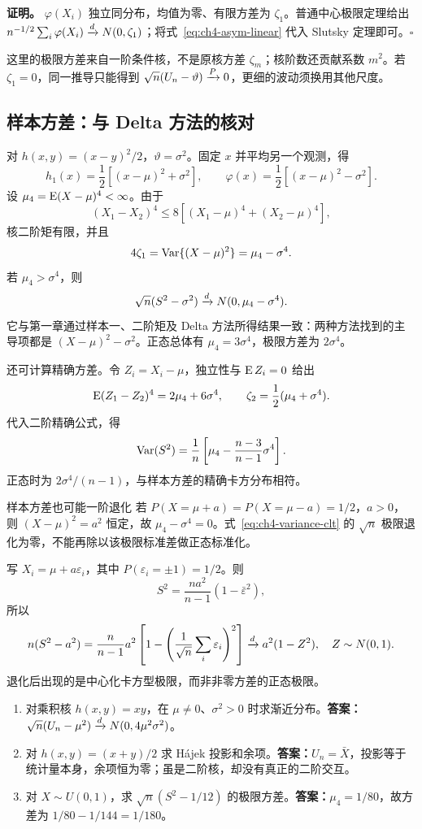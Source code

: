 \textbf{证明。} $\varphi(X_i)$ 独立同分布，均值为零、有限方差为 $\zeta_1$。普通中心极限定理给出 $n^{-1/2}\sum_i\varphi(X_i)\xrightarrow{d} N(0,\zeta_1)$；将式~\eqref{eq:ch4-asym-linear} 代入 Slutsky 定理即可。\hfill$\square$

这里的极限方差来自一阶条件核，不是原核方差 $\zeta_m$；核阶数还贡献系数 $m^2$。若 $\zeta_1=0$，同一推导只能得到 $\sqrt n(U_n-\vartheta)\xrightarrow{P}0$，更细的波动须换用其他尺度。

\subsection{样本方差：与 Delta 方法的核对}

对 $h(x,y)=(x-y)^2/2$，$\vartheta=\sigma^2$。固定 $x$ 并平均另一个观测，得
\[
 h_1(x)=\frac12[(x-\mu)^2+\sigma^2],\qquad
 \varphi(x)=\frac12[(x-\mu)^2-\sigma^2].
\]
设 $\mu_4=\operatorname{E}(X-\mu)^4<\infty$。由于
\[
 (X_1-X_2)^4\leq8[(X_1-\mu)^4+(X_2-\mu)^4],
\]
核二阶矩有限，并且
\[
 4\zeta_1=\operatorname{Var}\{(X-\mu)^2\}=\mu_4-\sigma^4.
\]
若 $\mu_4>\sigma^4$，则
\begin{equation}
 \sqrt n(S^2-\sigma^2)\xrightarrow{d} N(0,\mu_4-\sigma^4).
 \label{eq:ch4-variance-clt}
\end{equation}
它与第一章通过样本一、二阶矩及 Delta 方法所得结果一致：两种方法找到的主导项都是 $(X-\mu)^2-\sigma^2$。正态总体有 $\mu_4=3\sigma^4$，极限方差为 $2\sigma^4$。

还可计算精确方差。令 $Z_i=X_i-\mu$，独立性与 $\operatorname{E} Z_i=0$ 给出
\[
 \operatorname{E}(Z_1-Z_2)^4=2\mu_4+6\sigma^4,
 \qquad\zeta_2=\frac12(\mu_4+\sigma^4).
\]
代入二阶精确公式，得
\[
 \operatorname{Var}(S^2)=\frac1n
 \left[\mu_4-\frac{n-3}{n-1}\sigma^4\right].
\]
正态时为 $2\sigma^4/(n-1)$，与样本方差的精确卡方分布相符。

\begin{examplebox}{样本方差也可能一阶退化}
若 $P(X=\mu+a)=P(X=\mu-a)=1/2$，$a>0$，则 $(X-\mu)^2=a^2$ 恒定，故 $\mu_4-\sigma^4=0$。式~\eqref{eq:ch4-variance-clt} 的 $\sqrt n$ 极限退化为零，不能再除以该极限标准差做正态标准化。

写 $X_i=\mu+a\varepsilon_i$，其中 $P(\varepsilon_i=\pm1)=1/2$。则
\[
 S^2=\frac{na^2}{n-1}(1-\bar\varepsilon^2),
\]
所以
\[
 n(S^2-a^2)=\frac n{n-1}a^2
 \left[1-\left(\frac1{\sqrt n}\sum_i\varepsilon_i\right)^2\right]
 \xrightarrow{d} a^2(1-Z^2),\quad Z\sim N(0,1).
\]
退化后出现的是中心化卡方型极限，而非非零方差的正态极限。
\end{examplebox}

\begin{notebox}[练习与答案线索]
\begin{enumerate}
 \item 对乘积核 $h(x,y)=xy$，在 $\mu\neq0$、$\sigma^2>0$ 时求渐近分布。\textbf{答案：}$\sqrt n(U_n-\mu^2)\xrightarrow{d} N(0,4\mu^2\sigma^2)$。
 \item 对 $h(x,y)=(x+y)/2$ 求 H\'ajek 投影和余项。\textbf{答案：}$U_n=\bar X$，投影等于统计量本身，余项恒为零；虽是二阶核，却没有真正的二阶交互。
 \item 对 $X\sim U(0,1)$，求 $\sqrt n(S^2-1/12)$ 的极限方差。\textbf{答案：}$\mu_4=1/80$，故方差为 $1/80-1/144=1/180$。
\end{enumerate}
\end{notebox}

